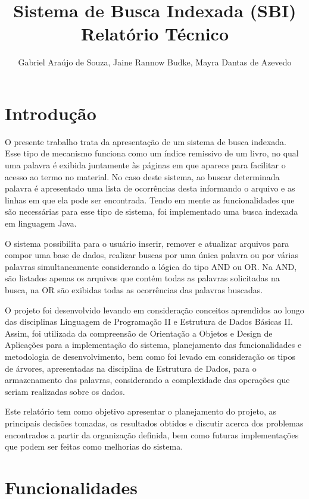 \documentclass[12pt]{article}
\title{Sistema de Busca Indexada (SBI)\\ Relatório Técnico}
\author{Gabriel Araújo de Souza\inst{1}, Jaine Rannow Budke\inst{2}, Mayra Dantas de Azevedo\inst{3} }
\begin{document}
 

\maketitle

\section{Introdução}

O presente trabalho trata da apresentação de um sistema de busca indexada. Esse tipo de mecanismo funciona como um índice remissivo de um livro, no qual uma palavra é exibida juntamente às páginas em que aparece para facilitar o acesso ao termo no material. No caso deste sistema, ao buscar determinada palavra é apresentado uma lista de ocorrências desta informando o arquivo e as linhas em que ela pode ser encontrada. Tendo em mente as funcionalidades que são necessárias para esse tipo de sistema, foi implementado uma busca indexada em linguagem Java.

O sistema possibilita para o usuário inserir, remover e atualizar arquivos para compor uma base de dados, realizar buscas por uma única palavra ou por várias palavras simultaneamente considerando a lógica do tipo AND ou OR. Na AND, são listados apenas os arquivos que contém todas as palavras solicitadas na busca, na OR são exibidas todas as ocorrências das palavras buscadas.

O projeto foi desenvolvido levando em consideração conceitos aprendidos ao longo das disciplinas Linguagem de Programação II e Estrutura de Dados Básicas II. Assim, foi utilizada da compreensão de Orientação a Objetos e Design de Aplicações para a implementação do sistema, planejamento das funcionalidades e metodologia de desenvolvimento, bem como foi levado em consideração os tipos de árvores, apresentadas na disciplina de Estrutura de Dados, para o armazenamento das palavras, considerando a complexidade das operações que seriam realizadas sobre os dados.

Este relatório tem como objetivo apresentar o planejamento do projeto, as principais decisões tomadas, os resultados obtidos e discutir acerca dos problemas encontrados a partir da organização definida, bem como futuras implementações que podem ser feitas como melhorias do sistema.

\section{Funcionalidades}
\end{document}
